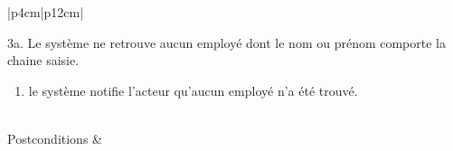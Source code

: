 \begin{longtable}{|p{4cm}|p{12cm}|}
                    \begin{minipage}[t]{\linewidth}
                        3a. Le système ne retrouve aucun employé dont le nom ou prénom comporte la chaine saisie.   \begin{enumerate}[nosep,after=\strut]
                              \item le système notifie l'acteur qu’aucun employé n'a \linebreak été  trouvé.
                        \end{enumerate}
                    \end{minipage}
                    \\
                    \hline
                    Postconditions &   \\
                    \hline
                \caption{Description du cas d'utilisation « Rechercher employé »}\\
            \end{longtable}        

